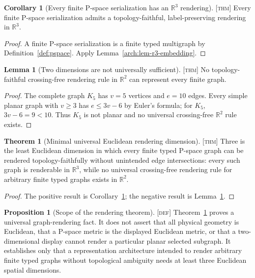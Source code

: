 \documentclass[11pt]{article}
\newcommand{\Defn}{\textsc{[def]}}
\newcommand{\Thm}{\textsc{[thm]}}
\theoremstyle{definition}
\newtheorem{sproposition}{Proposition}
\newtheorem{stheorem}[sdefinition]{Theorem}
\newtheorem{slemma}[sdefinition]{Lemma}
\newtheorem{scorollary}[sdefinition]{Corollary}
\begin{document}
\begin{scorollary}[Every finite P-space serialization has an $\mathbb R^3$ rendering]
\label{arch:cor-r3-pspace}
\Thm{} Every finite P-space serialization admits a topology-faithful,
label-preserving rendering in $\mathbb R^3$.
\end{scorollary}

\begin{proof}
A finite P-space serialization is a finite typed multigraph by
Definition~\ref{def:pspace}. Apply Lemma~\ref{arch:lem-r3-embedding}.
\end{proof}

\begin{slemma}[Two dimensions are not universally sufficient]
\label{arch:lem-r2-insufficient}
\Thm{} No topology-faithful crossing-free rendering rule in $\mathbb R^2$ can
represent every finite graph.
\end{slemma}

\begin{proof}
The complete graph $K_5$ has $v=5$ vertices and $e=10$ edges. Every simple planar
graph with $v\geq3$ has $e\leq3v-6$ by Euler's formula; for $K_5$, $3v-6=9<10$.
Thus $K_5$ is not planar and no universal crossing-free $\mathbb R^2$ rule exists.
\end{proof}

\begin{stheorem}[Minimal universal Euclidean rendering dimension]
\label{arch:thm-minimal-r3}
\Thm{} Three is the least Euclidean dimension in which every finite typed P-space
graph can be rendered topology-faithfully without unintended edge intersections:
every such graph is renderable in $\mathbb R^3$, while no universal crossing-free
rendering rule for arbitrary finite typed graphs exists in $\mathbb R^2$.
\end{stheorem}

\begin{proof}
The positive result is Corollary~\ref{arch:cor-r3-pspace}; the negative result is
Lemma~\ref{arch:lem-r2-insufficient}.\end{proof}

\begin{sproposition}[Scope of the rendering theorem]
\label{arch:prop-rendering-scope}
\Defn{} Theorem~\ref{arch:thm-minimal-r3} proves a universal graph-rendering fact.
It does not assert that all physical geometry is Euclidean, that a P-space metric
is the displayed Euclidean metric, or that a two-dimensional display cannot render
a particular planar selected subgraph. It establishes only that a representation
architecture intended to render arbitrary finite typed graphs without topological
ambiguity needs at least three Euclidean spatial dimensions.
\end{sproposition}
\end{document}

